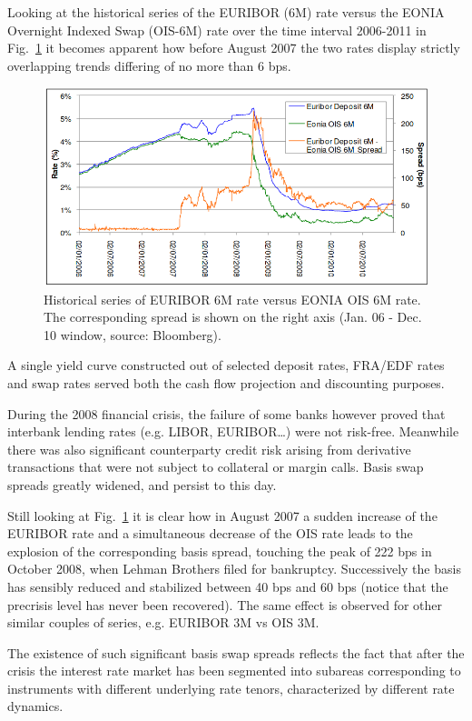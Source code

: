 Looking at the historical series of the EURIBOR (6M) rate versus the EONIA Overnight Indexed Swap (OIS-6M) rate over the time interval 2006-2011 in Fig.~\ref{fig:credit_crunch} it becomes apparent how before August 2007 the two rates display strictly overlapping trends differing of no more than 6 bps.

\begin{figure}[htb]
	\centering
	\includegraphics[width=0.9\linewidth]{figures/credit_crunch.png}
	\caption{Historical series of EURIBOR 6M rate versus EONIA OIS 6M rate. The corresponding spread 
		is shown on the right axis (Jan. 06 - Dec. 10 window, source: Bloomberg).}
	\label{fig:credit_crunch}
\end{figure}

A single yield curve constructed out of selected deposit rates, FRA/EDF rates and swap rates served both the cash flow projection and discounting purposes.

During the 2008 financial crisis, the failure of some banks however proved that interbank lending rates (e.g. LIBOR, EURIBOR\ldots) were not risk-free. Meanwhile there was also significant counterparty credit risk arising from derivative transactions that were not subject to collateral or margin calls. Basis swap spreads greatly widened, and persist to this day. 

Still looking at Fig.~\ref{fig:credit_crunch} it is clear how in August 2007 a sudden increase of the EURIBOR rate and a simultaneous decrease of the OIS rate leads to the explosion of the corresponding basis spread, touching the peak of 222 bps in October 2008, when Lehman Brothers filed for bankruptcy. Successively the basis has sensibly reduced and stabilized between 40 bps and 60 bps (notice that the precrisis level has never been recovered). The same effect is observed for other similar couples of series, e.g. EURIBOR 3M vs OIS 3M.

The existence of such significant basis swap spreads reflects the fact that after the crisis the interest rate market has been segmented into subareas corresponding to instruments with different underlying rate tenors, characterized by different rate dynamics. 

